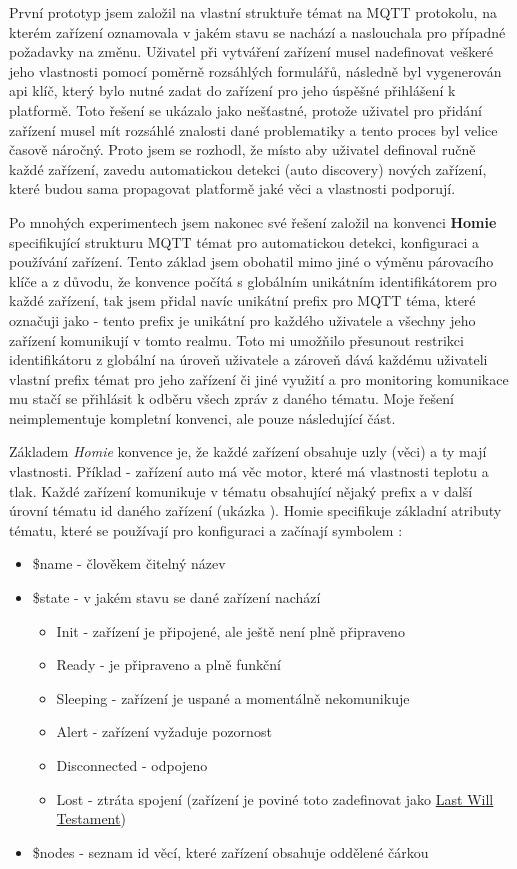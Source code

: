 První prototyp jsem založil na vlastní struktuře témat na MQTT protokolu, na kterém zařízení oznamovala v jakém stavu se nachází a naslouchala pro případné požadavky na změnu. Uživatel při vytváření zařízení musel nadefinovat veškeré jeho vlastnosti pomocí poměrně rozsáhlých formulářů, následně byl vygenerován api klíč, který bylo nutné zadat do zařízení pro jeho úspěšné přihlášení k platformě. Toto řešení se ukázalo jako nešťastné, protože uživatel pro přidání zařízení musel mít rozsáhlé znalosti dané problematiky a tento proces byl velice časově náročný. Proto jsem se rozhodl, že místo aby uživatel definoval ručně každé zařízení, zavedu automatickou detekci (auto discovery) nových zařízení, které budou sama propagovat platformě jaké věci a vlastnosti podporují.

Po mnohých experimentech jsem nakonec své řešení založil na konvenci \textbf{Homie} \cite{homie} specifikující strukturu MQTT témat pro automatickou detekci, konfiguraci a používání zařízení. Tento základ jsem obohatil mimo jiné o výměnu párovacího klíče a z důvodu, že konvence počítá s globálním unikátním identifikátorem pro každé zařízení, tak jsem přidal navíc unikátní prefix pro MQTT téma, které označuji jako  - tento prefix je unikátní pro každého uživatele a všechny jeho zařízení komunikují v tomto realmu. Toto mi umožňilo přesunout restrikci identifikátoru z globální na úroveň uživatele a zároveň dává každému uživateli vlastní prefix témat pro jeho zařízení či jiné využití a pro monitoring komunikace mu stačí se přihlásit k odběru všech zpráv z daného tématu. Moje řešení neimplementuje kompletní konvenci, ale pouze následující část.

Základem \textit{Homie} konvence je, že každé zařízení obsahuje uzly (věci) a ty mají vlastnosti. Příklad - zařízení auto má věc motor, které má vlastnosti teplotu a tlak. Každé zařízení komunikuje v tématu obsahující nějaký prefix a v další úrovní tématu id daného zařízení (ukázka ). Homie specifikuje základní atributy tématu, které se používají pro konfiguraci a začínají symbolem \uv{\$}:
\begin{itemize}
    \item \$name - člověkem čitelný název
    \item \$state - v jakém stavu se dané zařízení nachází
          \begin{itemize}
              \item  Init - zařízení je připojené, ale ještě není plně připraveno
              \item Ready - je připraveno a plně funkční
              \item Sleeping - zařízení je uspané a momentálně nekomunikuje
              \item  Alert - zařízení vyžaduje pozornost
              \item Disconnected - odpojeno
              \item Lost - ztráta spojení (zařízení je poviné toto zadefinovat jako \hyperlink{LWT}{Last Will Testament})
          \end{itemize}
    \item \$nodes - seznam id věcí, které zařízení obsahuje oddělené čárkou
\end{itemize}

